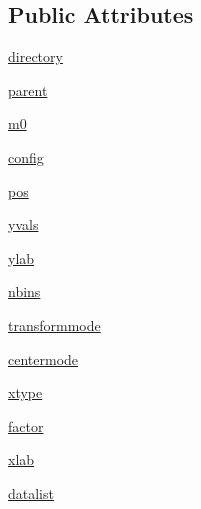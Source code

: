 \subsection*{Public Attributes}
\begin{DoxyCompactItemize}
\item 
\hyperlink{class_uni_dec_1_1unidec__modules_1_1_mass_defects_1_1_mass_defect_window_a14e1c775d72b77e541bd1a17444104b2}{directory}
\item 
\hyperlink{class_uni_dec_1_1unidec__modules_1_1_mass_defects_1_1_mass_defect_window_aee91c763bc5de97f862649023c8f4d1d}{parent}
\item 
\hyperlink{class_uni_dec_1_1unidec__modules_1_1_mass_defects_1_1_mass_defect_window_acbca30b4bcc2b68f72cdfd017af6c1b9}{m0}
\item 
\hyperlink{class_uni_dec_1_1unidec__modules_1_1_mass_defects_1_1_mass_defect_window_aa3411954b88aca2c7573660496f7df41}{config}
\item 
\hyperlink{class_uni_dec_1_1unidec__modules_1_1_mass_defects_1_1_mass_defect_window_a9114e90b6333bb3f295b94949636b05d}{pos}
\item 
\hyperlink{class_uni_dec_1_1unidec__modules_1_1_mass_defects_1_1_mass_defect_window_a4088447d3b1c7279ef14601e17e2c316}{yvals}
\item 
\hyperlink{class_uni_dec_1_1unidec__modules_1_1_mass_defects_1_1_mass_defect_window_af741719fe6141f55d699230c4b3dd798}{ylab}
\item 
\hyperlink{class_uni_dec_1_1unidec__modules_1_1_mass_defects_1_1_mass_defect_window_ae5f0be5114401c648a5a59f885419875}{nbins}
\item 
\hyperlink{class_uni_dec_1_1unidec__modules_1_1_mass_defects_1_1_mass_defect_window_a264095d46596c8cf4165ab8f5123b741}{transformmode}
\item 
\hyperlink{class_uni_dec_1_1unidec__modules_1_1_mass_defects_1_1_mass_defect_window_add934d7e045cfe084c2c70ea8dd237b7}{centermode}
\item 
\hyperlink{class_uni_dec_1_1unidec__modules_1_1_mass_defects_1_1_mass_defect_window_a6d1344f20d590bbb04e27c4cb45f4575}{xtype}
\item 
\hyperlink{class_uni_dec_1_1unidec__modules_1_1_mass_defects_1_1_mass_defect_window_a3d2340b721270873889edf0ab6a0edf8}{factor}
\item 
\hyperlink{class_uni_dec_1_1unidec__modules_1_1_mass_defects_1_1_mass_defect_window_aae4377c90fce98869f0985118caddd3a}{xlab}
\item 
\hyperlink{class_uni_dec_1_1unidec__modules_1_1_mass_defects_1_1_mass_defect_window_a990d981d4bac17f58cb7e16deefccfc5}{datalist}

\end{DoxyCompactItemize}
